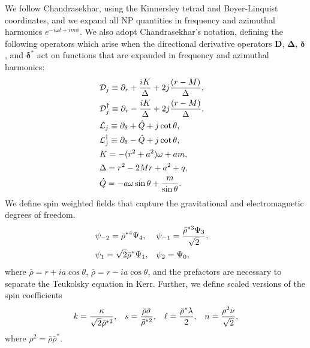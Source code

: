 \begin{refsection}
We follow Chandrasekhar, using the Kinnersley tetrad and Boyer-Linquist coordinates, and we expand all NP quantities in frequency and azimuthal harmonics  $e^{-i\omega t+im\phi}$. We also adopt Chandrasekhar's notation, defining the following operators which arise when the directional derivative operators $\mathbf{D}$, $\mathbf{\Delta}$, $\boldsymbol{\delta}$, and $\boldsymbol{\delta}^*$ act on functions that are expanded in frequency and azimuthal harmonics:
\begin{align}
&\mathcal{D}_j \equiv \partial_r+\frac{iK}{\Delta}+2j\frac{(r-M)}{\Delta},& \nonumber
\\ &\mathcal{D}_j^\dagger \equiv \partial_r-\frac{iK}{\Delta}+2j\frac{(r-M)}{\Delta},& \nonumber
\\ &\mathcal{L}_j \equiv \partial_\theta+\hat{Q}+j\cot\theta,& \nonumber
\\ &\mathcal{L}_j^\dagger \equiv \partial_\theta-\hat{Q}+j\cot\theta,& \nonumber
\\ &K=-(r^2+a^2)\omega+am,& \nonumber \\
&\Delta = r^2 -2Mr+a^2+q,& \nonumber \\
&\hat{Q}=-a\omega\sin\theta+\frac{m}{\sin\theta}.& \nonumber
\end{align}
We define spin weighted fields that capture the gravitational and electromagnetic degrees of freedom.
\begin{align}
&\psi_{-2} =\bar{\rho}^{*4}\Psi_4,& &\psi_{-1}=\frac{\bar{\rho}^{*3}\Psi_3}{\sqrt{2}},& \nonumber 
\\ &\psi_1=\sqrt{2} \bar{\rho}^*\Psi_1,& &\psi_2=\Psi_0,& \nonumber
\end{align}
where $\bar{\rho}=r+ia\cos\theta$, $\bar{\rho}=r-ia\cos\theta$, and the prefactors  are necessary to separate the Teukolsky equation in Kerr.
Further, we define scaled versions of the spin coefficients
\begin{align}
k=\frac{\kappa}{\sqrt{2}\bar{\rho}^{*2}}, & & s=\frac{\bar{\rho}\tilde\sigma}{\bar{\rho}^{*2}}, & & \ell =\frac{\bar{\rho}^*\lambda}{2}, & &n=\frac{\rho^2\nu}{\sqrt{2}},
\end{align}
where $\rho^2=\bar \rho \bar \rho^*$.


\end{refsection}
